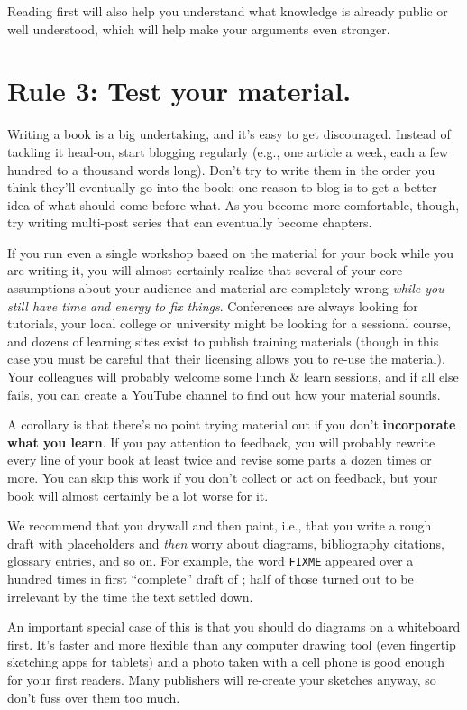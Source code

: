 \documentclass[10pt,letterpaper]{article}
\begin{document}
Reading first will also help you understand what knowledge is already
public or well understood, which will help make your arguments even
stronger.

\section*{Rule 3: Test your material.}

Writing a book is a big undertaking, and it's easy to get discouraged.
Instead of tackling it head-on, start blogging regularly (e.g., one
article a week, each a few hundred to a thousand words long). Don't try
to write them in the order you think they'll eventually go into the
book: one reason to blog is to get a better idea of what should come
before what. As you become more comfortable, though, try writing
multi-post series that can eventually become chapters.

If you run even a single workshop based on the material for your book
while you are writing it, you will almost certainly realize that several
of your core assumptions about your audience and material are completely
wrong \emph{while you still have time and energy to fix things}.
Conferences are always looking for tutorials, your local college or
university might be looking for a sessional course, and dozens of
learning sites exist to publish training materials (though in this case
you must be careful that their licensing allows you to re-use the
material). Your colleagues will probably welcome some lunch \& learn
sessions, and if all else fails, you can create a YouTube channel to
find out how your material sounds.

A corollary is that there's no point trying material out if you don't
\textbf{incorporate what you learn}. If you pay attention to feedback,
you will probably rewrite every line of your book at least twice and
revise some parts a dozen times or more. You can skip this work if you
don't collect or act on feedback, but your book will almost certainly be
a lot worse for it.

We recommend that you drywall and then paint, i.e., that you write a
rough draft with placeholders and \emph{then} worry about diagrams,
bibliography citations, glossary entries, and so on. For example, the
word \texttt{FIXME} appeared over a hundred times in first ``complete''
draft of \cite{Wi2019}; half of those turned out to be irrelevant by the
time the text settled down.

An important special case of this is that you should do diagrams on a
whiteboard first. It's faster and more flexible than any computer
drawing tool (even fingertip sketching apps for tablets) and a photo
taken with a cell phone is good enough for your first readers. Many
publishers will re-create your sketches anyway, so don't fuss over them
too much.
\end{document}
